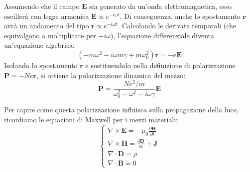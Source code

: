 \documentclass[openany,a4paper,12pt]{book}
\begin{document}
Assumendo che il campo $\mathbf{E}$ sia generato da un'onda elettromagnetica, esso oscillerà con legge armonica $\mathbf{E} \propto e^{- i \omega t}$. Di conseguenza, anche lo spostamento $\mathbf{r}$ avrà un andamento del tipo $\mathbf{r} \propto e^{- i \omega t}$. Calcolando le derivate temporali (che equivalgono a moltiplicare per $-i\omega$), l'equazione differenziale diventa un'equazione algebrica:
\begin{equation}
    (-m\omega^2 - i\omega m\gamma + m\omega_0^2)\mathbf{r} = -e\mathbf{E}
\end{equation}
Isolando lo spostamento $\mathbf{r}$ e sostituendolo nella definizione di polarizzazione $\mathbf{P} = -N e \mathbf{r}$, si ottiene la polarizzazione dinamica del mezzo:
\begin{equation}
    \mathbf{P} = \frac{N e^2/m}{\omega_0^2 - \omega^2 - i\omega \gamma} \mathbf{E}
\label{eq:polarizzazione_dinamica}
\end{equation}

Per capire come questa polarizzazione influisca sulla propagazione della luce, ricordiamo le equazioni di Maxwell per i mezzi materiali:
\begin{equation}
    \begin{cases}
        \nabla \times \mathbf{E}  = - \mu_0 \frac{\partial \mathbf{H}}{\partial t}\\
        \nabla \times \mathbf{H} = \frac{\partial \mathbf{D}}{\partial t} + \mathbf{J} \\
        \nabla \cdot \mathbf{D} = \rho \\
        \nabla \cdot \mathbf{B} = 0
    \end{cases}
\end{equation}
\end{document}
